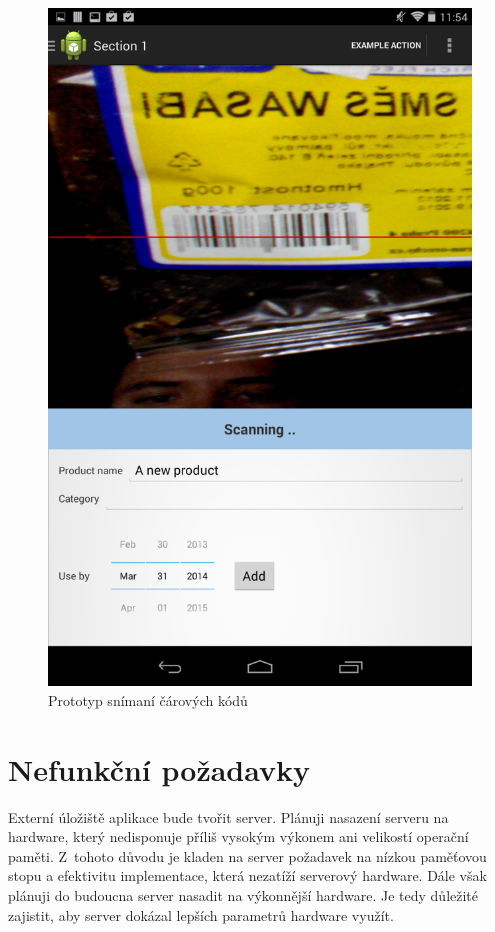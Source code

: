 \documentclass[thesis=B,czech]{FITthesis}[2013/10/20]
\begin{document}
\begin{figure}[H]
  \centering
  \includegraphics[scale=0.3]{screenshots/scan_prototype.png}
  \caption{Prototyp snímaní čárových kódů}
  \label{fig:ScanPrototype}
\end{figure}

\section{Nefunkční požadavky}

Externí úložiště aplikace bude tvořit server. Plánuji nasazení serveru na hardware, který nedisponuje příliš vysokým výkonem ani velikostí operační paměti. Z~tohoto důvodu je kladen na server požadavek na nízkou paměťovou stopu a efektivitu implementace, která nezatíží serverový hardware. Dále však plánuji do budoucna server nasadit na výkonnější hardware. Je tedy důležité zajistit, aby server dokázal lepších parametrů hardware využít.
\end{document}
